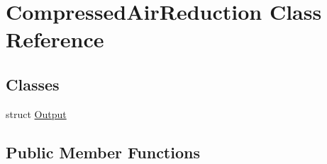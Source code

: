 \hypertarget{class_compressed_air_reduction}{}\section{Compressed\+Air\+Reduction Class Reference}
\label{class_compressed_air_reduction}
\subsection*{Classes}
\begin{DoxyCompactItemize}
\item 
struct \hyperlink{struct_compressed_air_reduction_1_1_output}{Output}
\end{DoxyCompactItemize}
\subsection*{Public Member Functions}
